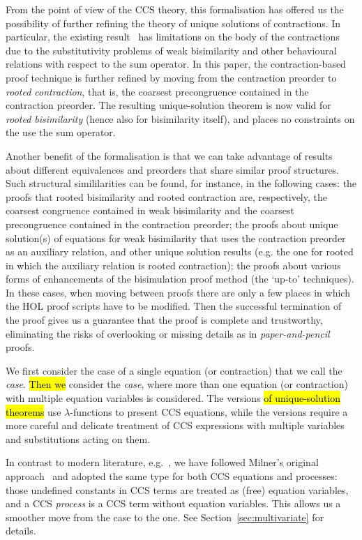 From the point of view of the CCS theory, this formalisation has offered us the possibility of
further refining the theory of unique solutions of contractions.
In particular, the existing result~\cite{sangiorgi2017equations} has limitations on the body of the contractions due to the
substitutivity problems of weak bisimilarity and other behavioural relations with respect
to the sum operator.
In this paper, the contraction-based proof technique is further
refined by moving from the contraction preorder to
\emph{rooted contraction}, that is, the coarsest precongruence contained in the contraction
preorder. The resulting unique-solution theorem is now valid for
\emph{rooted bisimilarity} (hence also for bisimilarity itself), and places no 
constraints on the use the sum operator.

Another benefit of the formalisation is 
that we can take advantage of results about different 
equivalences and preorders that share similar proof structures.
Such structural simililarities can be found, for instance, in the
following cases: the proofs that rooted bisimilarity and rooted
contraction are, respectively, the coarsest congruence contained in
weak bisimilarity and the coarsest precongruence contained in the
contraction preorder; the proofs about unique solution(s) of equations
for weak bisimilarity that uses the contraction preorder as an
auxiliary relation, and other unique solution results (e.g. the one
for rooted in which the auxiliary relation is rooted contraction); the
proofs about various forms of enhancements of the bisimulation proof
method (the `up-to' techniques).
%
In these cases, when moving between proofs there are only a few places in
which the HOL proof scripts have to be modified.
Then the successful termination of the proof gives us a guarantee that the proof is
complete and trustworthy, eliminating the risks 
of overlooking or missing details as in \emph{paper-and-pencil} proofs.

We first consider the case of a single equation (or contraction)
that we call the \emph{\univariate case}. \hl{Then we} consider
the \emph{\multivariate case}, where more than one equation
  (or contraction) with multiple equation variables is considered.
The \univariate versions \hl{of unique-solution theorems} use
$\lambda$-functions to present CCS equations,
while the \multivariate versions require a
more careful and delicate treatment of CCS
expressions with multiple variables and substitutions acting on them.

In contrast to modern literature, e.g.~\cite{Gorrieri:2015jt},
we have followed Milner's original approach~\cite{milner1990operational} and adopted the same
type for both CCS equations and processes: those undefined constants
in CCS terms are treated as  (free) equation variables, and a CCS
\emph{process} is a CCS term without equation variables. 
This allows us a smoother move from the \univariate case to the \multivariate
one. See Section~\ref{sec:multivariate} for  details.

